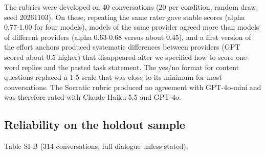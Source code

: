\documentclass[
  12pt,
]{article}
\begin{document}
The rubrics were developed on 40 conversations (20 per condition, random draw, seed 20261103). On these, repeating the same rater gave stable scores (alpha 0.77-1.00 for four models), models of the same provider agreed more than models of different providers (alpha 0.63-0.68 versus about 0.45), and a first version of the effort anchors produced systematic differences between providers (GPT scored about 0.5 higher) that disappeared after we specified how to score one-word replies and the pasted task statement. The yes/no format for content questions replaced a 1-5 scale that was close to its minimum for most conversations. The Socratic rubric produced no agreement with GPT-4o-mini and was therefore rated with Claude Haiku 5.5 and GPT-4o.

\subsection{Reliability on the holdout sample}\label{reliability-on-the-holdout-sample}

Table SI-B (314 conversations; full dialogue unless stated):
\end{document}
